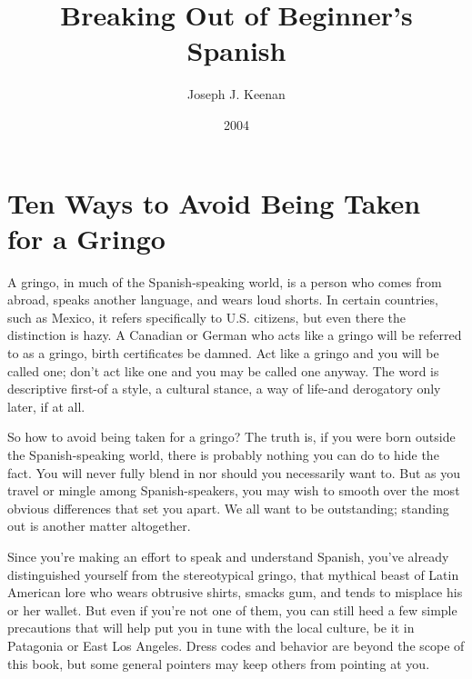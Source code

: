 \documentclass[14pt,a4paper,oneside]{memoir}
\begin{document}
\frontmatter

\begin{titlingpage}
\title{Breaking Out of Beginner's Spanish}
\posttitle{\par\vskip1em{\normalfont\normalsize\maltese\par}\end{center}}
\author{Joseph J. Keenan}
\date{2004}

\maketitle
\end{titlingpage}

\tableofcontents*

\mainmatter

\chapter{Ten Ways to Avoid Being Taken for a Gringo}

A gringo, in much of the Spanish-speaking world, is a person
who comes from abroad, speaks another language, and wears loud
shorts. In certain countries, such as Mexico, it refers specifically to
U.S. citizens, but even there the distinction is hazy. A Canadian or
German who acts like a gringo will be referred to as a gringo, birth certificates be damned. Act like a gringo and you will be called one; don't
act like one and you may be called one anyway. The word is descriptive
first-of a style, a cultural stance, a way of life-and derogatory only
later, if at all.

So how to avoid being taken for a gringo? The truth is, if you
were born outside the Spanish-speaking world, there is probably nothing you can do to hide the fact. You will never fully blend in nor
should you necessarily want to. But as you travel or mingle among
Spanish-speakers, you may wish to smooth over the most obvious differences that set you apart. We all want to be outstanding; standing out
is another matter altogether.

Since you're making an effort to speak and understand Spanish, you've already distinguished yourself from the stereotypical
gringo, that mythical beast of Latin American lore who wears obtrusive shirts, smacks gum, and tends to misplace his or her wallet. But
even if you're not one of them, you can still heed a few simple precautions that will help put you in tune with the local culture, be it in Patagonia or East Los Angeles. Dress codes and behavior are beyond the
scope of this book, but some general pointers may keep others from
pointing at you.
\end{document}
